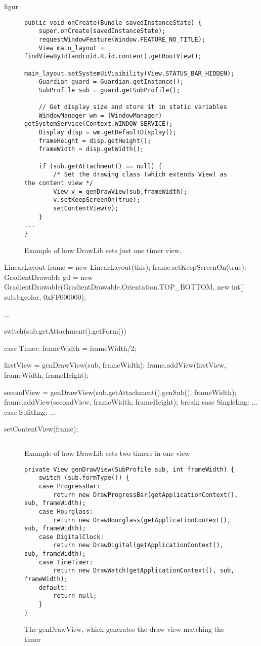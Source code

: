 figur\begin{figure}[H]
\begin{lstlisting}
public void onCreate(Bundle savedInstanceState) {
	super.onCreate(savedInstanceState);	
	requestWindowFeature(Window.FEATURE_NO_TITLE);
	View main_layout = findViewById(android.R.id.content).getRootView();
	main_layout.setSystemUiVisibility(View.STATUS_BAR_HIDDEN);
	Guardian guard = Guardian.getInstance();
	SubProfile sub = guard.getSubProfile();

	// Get display size and store it in static variables
	WindowManager wm = (WindowManager) getSystemService(Context.WINDOW_SERVICE);
	Display disp = wm.getDefaultDisplay();
	frameHeight = disp.getHeight();
	frameWidth = disp.getWidth();				

	if (sub.getAttachment() == null) {
		/* Set the drawing class (which extends View) as the content view */
		View v = genDrawView(sub,frameWidth);
		v.setKeepScreenOn(true);
		setContentView(v);
	} 
...
}
\end{lstlisting}
\caption{Example of how DrawLib sets just one timer view.}%
\label{code:backend_drawlib_singletimer}%
\end{figure}
LinearLayout frame = new LinearLayout(this);
frame.setKeepScreenOn(true);
GradientDrawable gd = new GradientDrawable(GradientDrawable.Orientation.TOP_BOTTOM, new int[] {sub.bgcolor, 0xFF000000});

...

switch(sub.getAttachment().getForm()){
case Timer:
	frameWidth = frameWidth/2;
	
	firstView = genDrawView(sub, frameWidth);
	frame.addView(firstView, frameWidth, frameHeight);
	
	secondView = genDrawView(sub.getAttachment().genSub(), frameWidth);
	frame.addView(secondView, frameWidth, frameHeight);
	break;
case SingleImg:
	...
case SplitImg:
	...
}

setContentView(frame);
\begin{figure}[H]%
\begin{lstlisting}
\end{lstlisting}
\caption{Example of how DrawLib sets two timers in one view}%
\label{code:backend_drawlib_splittimer}%
\end{figure}

\begin{figure}[H]%
\begin{lstlisting}
private View genDrawView(SubProfile sub, int frameWidth) {
	switch (sub.formType()) {
	case ProgressBar:
		return new DrawProgressBar(getApplicationContext(), sub, frameWidth);
	case Hourglass:
		return new DrawHourglass(getApplicationContext(), sub, frameWidth);
	case DigitalClock:
		return new DrawDigital(getApplicationContext(), sub, frameWidth);
	case TimeTimer:
		return new DrawWatch(getApplicationContext(), sub, frameWidth);
	default:
		return null;
	}
}
\end{lstlisting}
\caption{The genDrawView, which generates the draw view matching the timer}%
\label{code:backend_drawlib_gendrawview}%
\end{figure}

